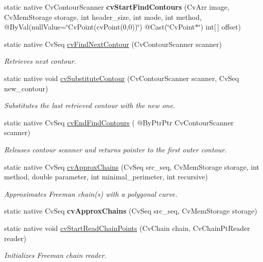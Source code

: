 \begin{DoxyCompactItemize}
static native Cv\+Contour\+Scanner {\bfseries cv\+Start\+Find\+Contours} (Cv\+Arr image, Cv\+Mem\+Storage storage, int header\+\_\+size, int mode, int method, @By\+Val(null\+Value=\char`\"{}Cv\+Point(cv\+Point(0,0))\char`\"{}) @Cast(\char`\"{}Cv\+Point$\ast$\char`\"{}) int\mbox{[}$\,$\mbox{]} offset)
\item 
static native Cv\+Seq \hyperlink{group__imgproc__c_gab3ea632f49f741ef73888cd1ab8f9556}{cv\+Find\+Next\+Contour} (Cv\+Contour\+Scanner scanner)
\begin{DoxyCompactList}\small\item\em Retrieves next contour. \end{DoxyCompactList}\item 
static native void \hyperlink{group__imgproc__c_ga9d72a578b9f29589e8b85b100cd25e01}{cv\+Substitute\+Contour} (Cv\+Contour\+Scanner scanner, Cv\+Seq new\+\_\+contour)
\begin{DoxyCompactList}\small\item\em Substitutes the last retrieved contour with the new one. \end{DoxyCompactList}\item 
static native Cv\+Seq \hyperlink{group__imgproc__c_ga79913a8abbec2491176f92da28a62346}{cv\+End\+Find\+Contours} ( @By\+Ptr\+Ptr Cv\+Contour\+Scanner scanner)
\begin{DoxyCompactList}\small\item\em Releases contour scanner and returns pointer to the first outer contour. \end{DoxyCompactList}\item 
static native Cv\+Seq \hyperlink{group__imgproc__c_ga5c874856009b84fc0c3a9533f957516c}{cv\+Approx\+Chains} (Cv\+Seq src\+\_\+seq, Cv\+Mem\+Storage storage, int method, double parameter, int minimal\+\_\+perimeter, int recursive)
\begin{DoxyCompactList}\small\item\em Approximates Freeman chain(s) with a polygonal curve. \end{DoxyCompactList}\item 
static native Cv\+Seq {\bfseries cv\+Approx\+Chains} (Cv\+Seq src\+\_\+seq, Cv\+Mem\+Storage storage)
\item 
static native void \hyperlink{group__imgproc__c_gab6502128f5100580662a79a7326e50e0}{cv\+Start\+Read\+Chain\+Points} (Cv\+Chain chain, Cv\+Chain\+Pt\+Reader reader)
\begin{DoxyCompactList}\small\item\em Initializes Freeman chain reader. \end{DoxyCompactList}\item 

\end{DoxyCompactItemize}
